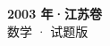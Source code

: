 \documentclass[zihao=-4, a4paper]{ctexart}
\begin{document}
\begin{center}
  {\Large\bfseries 2003 年·江苏卷}\\[4pt]
  {\large 数学 · 试题版}
\end{center}
\medskip
{}

\end{document}
